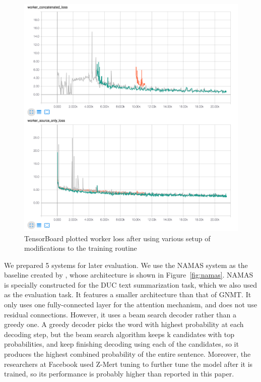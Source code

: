 \documentclass[letterpaper]{article} %
\begin{document}
\begin{figure}[h]
	\includegraphics[scale=0.3]{worker_loss_after}
	\centering
	\caption{TensorBoard plotted worker loss after using various setup of modifications to the training routine}
	\label{fig:workerlossafter}
\end{figure}

We prepared 5 systems for later evaluation. We use the NAMAS system as the baseline created by \cite{rush2015neural}, whose architecture is shown in Figure~\ref{fig:namas}. NAMAS is specially constructed for the DUC text summarization task, which we also used as the evaluation task. It features a smaller architecture than that of GNMT. It only uses one fully-connected layer for the attention mechanism, and does not use residual connections. However, it uses a beam search decoder rather than a greedy one. A greedy decoder picks the word with highest probability at each decoding step, but the beam search algorithm keeps k candidates with top probabilities, and keep finishing decoding using each of the candidates, so it produces the highest combined probability of the entire sentence. Moreover, the researchers at Facebook used Z-Mert tuning to further tune the model after it is trained, so its performance is probably higher than reported in this paper.
\end{document}
